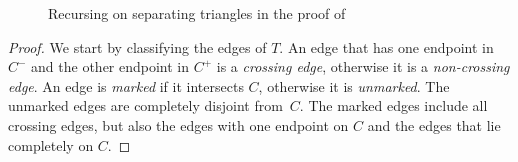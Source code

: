 
\begin{figure}[tb]
	\caption{Recursing on separating triangles in the proof of
		}
\end{figure}

\begin{proof}
  We start by classifying the edges of $T$.  An edge that has one
  endpoint in $C^-$ and the other endpoint in $C^+$ is a \emph{crossing
    edge}, otherwise it is a \emph{non-crossing edge}.
%
  An edge
  is \emph{marked} if it intersects $C$, otherwise it is
  \emph{unmarked}.  The unmarked edges are completely disjoint
  from~$C$.  The marked edges include all crossing edges, but also the
  edges with one endpoint on $C$ and the edges that lie completely on
  $C$.
	
	


\end{proof}
